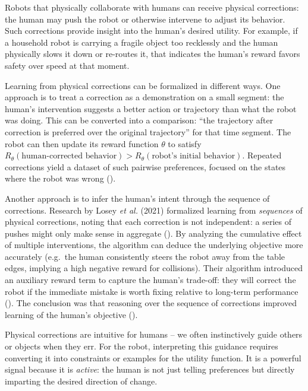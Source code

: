 \documentclass[
  letterpaper,
  numbers=noenddot,
  DIV=11]{scrreprt}
\theoremstyle{plain}
\theoremstyle{definition}
\theoremstyle{remark}
\begin{document}
Robots that physically collaborate with humans can receive physical
corrections: the human may push the robot or otherwise intervene to
adjust its behavior. Such corrections provide insight into the human's
desired utility. For example, if a household robot is carrying a fragile
object too recklessly and the human physically slows it down or
re-routes it, that indicates the human's reward favors safety over speed
at that moment.

Learning from physical corrections can be formalized in different ways.
One approach is to treat a correction as a demonstration on a small
segment: the human's intervention suggests a better action or trajectory
than what the robot was doing. This can be converted into a comparison:
``the trajectory after correction is preferred over the original
trajectory'' for that time segment. The robot can then update its reward
function \(\theta\) to satisfy
\(R_\theta(\text{human-corrected behavior}) > R_\theta(\text{robot’s initial behavior})\).
Repeated corrections yield a dataset of such pairwise preferences,
focused on the states where the robot was wrong
().

Another approach is to infer the human's intent through the sequence of
corrections. Research by Losey \emph{et al.} (2021) formalized learning
from \emph{sequences} of physical corrections, noting that each
correction is not independent: a series of pushes might only make sense
in aggregate
().
By analyzing the cumulative effect of multiple interventions, the
algorithm can deduce the underlying objective more accurately (e.g.~the
human consistently steers the robot away from the table edges, implying
a high negative reward for collisions). Their algorithm introduced an
auxiliary reward term to capture the human's trade-off: they will
correct the robot if the immediate mistake is worth fixing relative to
long-term performance
().
The conclusion was that reasoning over the sequence of corrections
improved learning of the human's objective
().

Physical corrections are intuitive for humans -- we often instinctively
guide others or objects when they err. For the robot, interpreting this
guidance requires converting it into constraints or examples for the
utility function. It is a powerful signal because it is \emph{active}:
the human is not just telling preferences but directly imparting the
desired direction of change.
\end{document}
